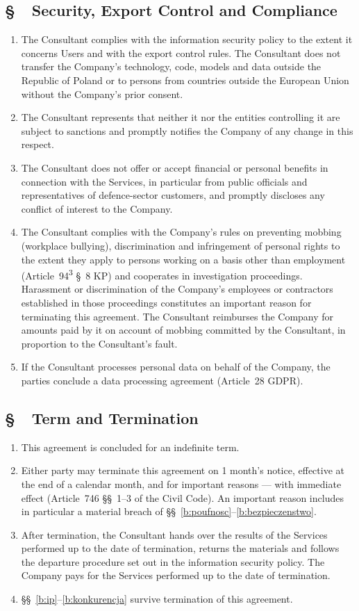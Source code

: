 \documentclass[11pt,a4paper]{report}
\newcounter{paragraf}
\newcommand{\paragraf}[1]{%
  \refstepcounter{paragraf}%
  \Needspace{5\baselineskip}%
  \subsection*{\S~\theparagraf\ #1}%
}
\newenvironment{ContractClause}[1]{\paragraf{#1}}{\par}
\begin{document}
\begin{ContractClause}{Security, Export Control and Compliance}
\label{b:bezpieczenstwo}
\begin{enumerate}
  \item The Consultant complies with the information security policy to the extent it concerns Users and with the export control rules. The Consultant does not transfer the Company's technology, code, models and data outside the Republic of Poland or to persons from countries outside the European Union without the Company's prior consent.
  \item The Consultant represents that neither it nor the entities controlling it are subject to sanctions and promptly notifies the Company of any change in this respect.
  \item The Consultant does not offer or accept financial or personal benefits in connection with the Services, in particular from public officials and representatives of defence-sector customers, and promptly discloses any conflict of interest to the Company.
  \item The Consultant complies with the Company's rules on preventing mobbing (workplace bullying), discrimination and infringement of personal rights to the extent they apply to persons working on a basis other than employment (Article~94\textsuperscript{3} \S~8 KP) and cooperates in investigation proceedings. Harassment or discrimination of the Company's employees or contractors established in those proceedings constitutes an important reason for terminating this agreement. The Consultant reimburses the Company for amounts paid by it on account of mobbing committed by the Consultant, in proportion to the Consultant's fault.
  \item If the Consultant processes personal data on behalf of the Company, the parties conclude a data processing agreement (Article~28 GDPR).
\end{enumerate}
\end{ContractClause}

\begin{ContractClause}{Term and Termination}
\begin{enumerate}
  \item This agreement is concluded for an indefinite term.
  \item Either party may terminate this agreement on 1 month's notice, effective at the end of a calendar month, and for important reasons --- with immediate effect (Article~746 \S\S~1--3 of the Civil Code). An important reason includes in particular a material breach of \S\S~\ref{b:poufnosc}--\ref{b:bezpieczenstwo}.
  \item After termination, the Consultant hands over the results of the Services performed up to the date of termination, returns the materials and follows the departure procedure set out in the information security policy. The Company pays for the Services performed up to the date of termination.
  \item \S\S~\ref{b:ip}--\ref{b:konkurencja} survive termination of this agreement.
\end{enumerate}
\end{ContractClause}
\end{document}
